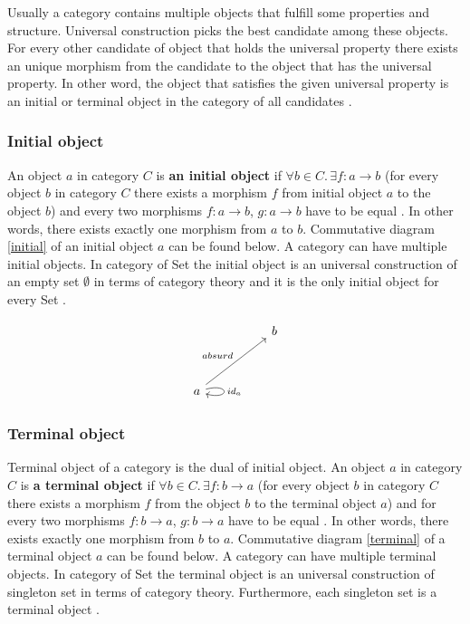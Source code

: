 \documentclass[article]{aaltoseries}
\begin{document}
    Usually a category contains multiple objects that fulfill some properties and
    structure. Universal construction picks the best candidate among these
    objects. For every other candidate of object that holds the universal
    property there exists an unique morphism from the candidate to the object that
    has the universal property. In other word, the object that satisfies the given
    universal property is an initial or terminal object in the category of all
    candidates \cite{pierce1991basic}.
  

  \subsubsection{Initial object}
    An object $a$ in category $C$ is \textbf{an initial object} if $\forall b \in
    C.\,\exists f: a \rightarrow b$ (for every object $b$ in category $C$ there
    exists a morphism $f$ from initial object $a$ to the object $b$) and every
    two morphisms $f: a \rightarrow b$, $g: a \rightarrow b$ have to be
    equal \cite{barr1990category, pierce1991basic}. In other words, there exists
    exactly one morphism from $a$ to $b$. Commutative diagram \ref{initial} of an initial
    object $a$ can be found below. A category can have multiple initial
    objects. In category of Set the initial object is an universal construction
    of an empty set $\emptyset$ in terms of category theory and it is the only initial
    object for every Set \cite{barr1990category, pierce1991basic}.

    \begin{equation}
      \label{initial}
      \begin{tikzcd}[row sep=huge, column sep=huge]
        & b \\
        a \arrow[ur, "absurd"]
        \arrow[loop right, distance=2em, "id_{a}"]
        & 
      \end{tikzcd}
    \end{equation}


  \subsubsection{Terminal object}
    Terminal object of a category is the dual of initial object. An object $a$
    in category $C$ is \textbf{a terminal object} if $\forall b \in C.\,\exists
    f: b \rightarrow a$ (for every object $b$ in category $C$ there exists a
    morphism $f$ from the object $b$ to the terminal object $a$) and for every
    two morphisms $f: b \rightarrow a$, $g: b \rightarrow a$ have to be equal
    \cite{barr1990category, pierce1991basic}. In other words, there exists
    exactly one morphism from $b$ to $a$. Commutative diagram \ref{terminal} of
    a terminal object $a$ can be found below. A category can have multiple terminal
    objects. In category of Set the terminal object is an universal construction
    of singleton set in terms of category theory. Furthermore, each singleton
    set is a terminal object \cite{barr1990category, pierce1991basic}.
\end{document}
